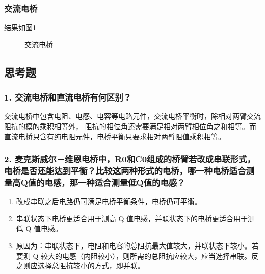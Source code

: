 \documentclass[12pt,a4paper,UTF8]{ctexart}
\begin{document}
\subsubsection*{交流电桥}
结果如图\ref{fig:3}
\begin{figure}[htbp]
    \centering
    \caption{交流电桥}
    \label{fig:3}
\end{figure}

\subsection*{思考题}
\subsubsection*{1. 交流电桥和直流电桥有何区别？}
交流电桥中包含电阻、电感、电容等电路元件，交流电桥平衡时，除相对两臂交流阻抗的模的乘积相等外，
阻抗的相位角还需要满足相对两臂相位角之和相等。而直流电桥只含有纯电阻元件，电桥平衡只要求相对两臂阻值乘积相等。
\subsubsection*{2. 麦克斯威尔－维恩电桥中，R0和C0组成的桥臂若改成串联形式，电桥是否还能达到平衡？比较这两种形式的电桥，哪一种电桥适合测量高Q值的电感，那一种适合测量低Q值的电感？}
\begin{enumerate}[label=\arabic*.]
    \item 改成串联之后电路仍可满足电桥平衡条件，电桥仍可平衡。
    \item 串联状态下电桥更适合用于测高 Q 值电感，并联状态下的电桥更适合用于测低 Q 值电感。
    \item 原因为：串联状态下，电阻和电容的总阻抗最大值较大，并联状态下较小。若要测 Q 较大的电感（内阻较小），则所需的总阻抗应较大，应当选择串联。反之则应选择总阻抗较小的方式，即并联。
\end{enumerate}
\end{document}
